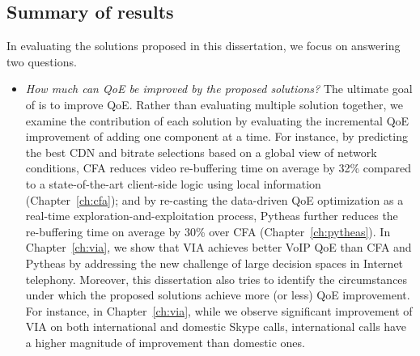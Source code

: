 
\subsection{Summary of results}
In evaluating the solutions proposed in this dissertation, 
we focus on answering two questions.

\begin{itemize}

\item {\em How much can QoE be improved by the proposed solutions?}
The ultimate goal of \ddn is to improve QoE. 
Rather than evaluating multiple solution together, we examine the 
contribution of each solution by evaluating the incremental QoE 
improvement of adding one component at a time. 
For instance, by predicting the best CDN and bitrate selections based on 
a global view of network conditions, CFA reduces video re-buffering time 
on average by 32\% compared to a state-of-the-art client-side logic using 
local information (Chapter~\ref{ch:cfa});
and by re-casting the data-driven QoE optimization as a real-time 
exploration-and-exploitation process, Pytheas further reduces the 
re-buffering time on average by 30\% over CFA (Chapter~\ref{ch:pytheas}).
In Chapter~\ref{ch:via}, we show that VIA achieves better VoIP QoE
than CFA and Pytheas
by addressing the new challenge of large decision spaces in
Internet telephony.
Moreover, this dissertation also tries to identify the circumstances under which
the proposed solutions achieve more (or less) QoE improvement.
For instance, in Chapter~\ref{ch:via}, while 
we observe significant improvement of 
VIA on both international and domestic Skype calls, international calls
have a higher magnitude of improvement than domestic ones.




\end{itemize}

